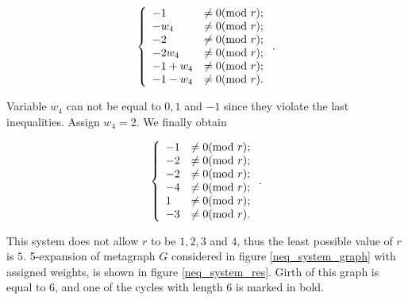 \documentclass[a4paper,fleqn]{cas-sc}
\begin{document}
\begin{equation}
    \centering
    \left\{
        \begin{array}{ll}
            - 1 &\neq 0        (\mod{r}); \\
            - w_4 &\neq 0      (\mod{r}); \\
            - 2 &\neq 0        (\mod{r}); \\
            - 2 w_4 &\neq 0    (\mod{r}); \\
            - 1 + w_4 &\neq 0  (\mod{r}); \\
            - 1 - w_4 &\neq 0  (\mod{r}). \\
        \end{array}
    \right..
    \label{eqs:cycle_search_neqs_3}
\end{equation}

Variable $w_4$ can not be equal to $0, 1$ and $-1$ since they violate the last inequalities. Assign $w_4 = 2$. We finally obtain

\begin{equation}
    \centering
    \left\{
        \begin{array}{ll}
            - 1 &\neq 0    (\mod{r}) ; \\
            - 2 &\neq 0    (\mod{r}) ; \\
            - 2 &\neq 0    (\mod{r}) ; \\
            - 4 &\neq 0    (\mod{r}) ; \\
              1 &\neq 0    (\mod{r}) ; \\
            - 3 &\neq 0    (\mod{r}) . \\
        \end{array}
    \right..
    \label{eqs:cycle_search_neqs_4}
\end{equation}

This system does not allow $r$ to be $1, 2, 3$ and $4$, thus the least possible value of $r$ is $5$. 5-expansion of metagraph $G$ considered in figure \ref{neq_system_graph} with assigned weights, is shown in figure \ref{neq_system_res}. Girth of this graph is equal to $6$, and one of the cycles with length $6$ is marked in bold.
\end{document}
